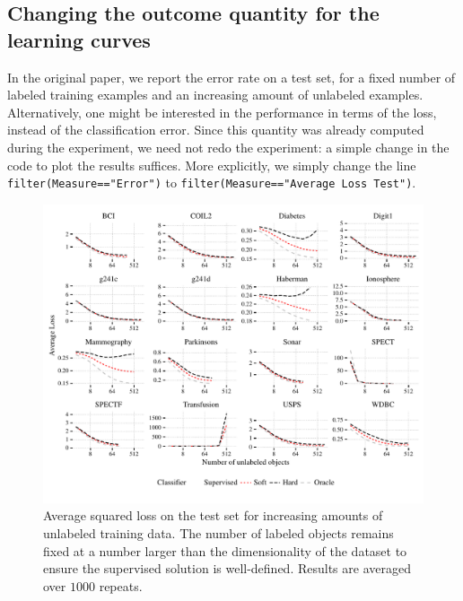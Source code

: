 \documentclass[runningheads,a4paper]{llncs}\usepackage[]{graphicx}\usepackage[]{color}
\makeatletter
\def\maxwidth{ %
  \ifdim\Gin@nat@width>\linewidth
    \linewidth
  \else
    \Gin@nat@width
  \fi
}
\newenvironment{knitrout}{}{} %
\newcommand{\inlinecode}{\texttt}
\makeatother
\begin{document}
\subsection{Changing the outcome quantity for the learning curves}
In the original paper, we report the error rate on a test set, for a fixed number of labeled training examples and an increasing amount of unlabeled examples. Alternatively, one might be interested in the performance in terms of the loss, instead of the classification error. Since this quantity was already computed during the experiment, we need not redo the experiment: a simple change in the code to plot the results suffices. More explicitly, we simply change the line \inlinecode{filter(Measure=="Error")} to \inlinecode{filter(Measure=="Average Loss Test")}.

\begin{knitrout}
\color{fgcolor}\begin{figure}
\includegraphics[width=\maxwidth]{figure/learningcurves-loss-1} \caption[Average squared loss on the test set for increasing amounts of unlabeled training data]{Average squared loss on the test set for increasing amounts of unlabeled training data. The number of labeled objects remains fixed at a number larger than the dimensionality of the dataset to ensure the supervised solution is well-defined. Results are averaged over $1000$ repeats.}\label{fig:learningcurves-loss}
\end{figure}


\end{knitrout}
\end{document}
